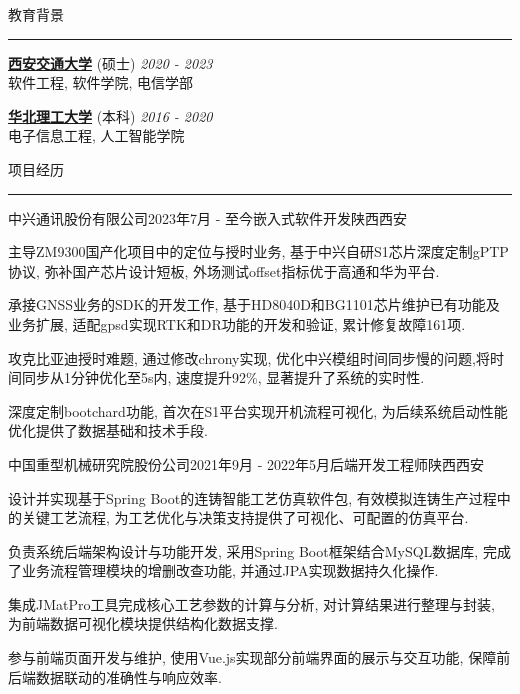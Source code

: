 \documentclass{cv} %
\renewenvironment{rSection}[1]{
\sectionskip
\textcolor{RoyalPurple}{\MakeUppercase{#1}}
\sectionlineskip
\hrule
\begin{list}{}{
\setlength{\leftmargin}{1.5em}
}
\item[]
}{
\end{list}
}
\begin{document}
\begin{rSection}{教育背景}

  {\bf \href{https://www.xjtu.edu.cn}{西安交通大学}} (硕士) \hfill {\em 2020 - 2023}
  \smallskip \\ 软件工程, 软件学院, 电信学部 \hfill

  {\bf \href{https://www.ncst.edu.cn}{华北理工大学}} (本科) \hfill {\em 2016 - 2020}
  \smallskip \\ 电子信息工程, 人工智能学院 \hfill

\end{rSection}

\begin{rSection}{项目经历}

  \begin{rSubsection}{中兴通讯股份有限公司}{2023年7月 - 至今}{嵌入式软件开发}{陕西西安}
    \item 主导ZM9300国产化项目中的定位与授时业务, 基于中兴自研S1芯片深度定制gPTP协议, 弥补国产芯片设计短板, 外场测试offset指标优于高通和华为平台.
    \item 承接GNSS业务的SDK的开发工作, 基于HD8040D和BG1101芯片维护已有功能及业务扩展, 适配gpsd实现RTK和DR功能的开发和验证, 累计修复故障161项.
    \item 攻克比亚迪授时难题, 通过修改chrony实现, 优化中兴模组时间同步慢的问题,将时间同步从1分钟优化至5s内, 速度提升92\%, 显著提升了系统的实时性.
    \item 深度定制bootchard功能, 首次在S1平台实现开机流程可视化, 为后续系统启动性能优化提供了数据基础和技术手段.
  \end{rSubsection}


  \begin{rSubsection}{中国重型机械研究院股份公司}{2021年9月 - 2022年5月}{后端开发工程师}{陕西西安}
    \item 设计并实现基于Spring Boot的连铸智能工艺仿真软件包, 有效模拟连铸生产过程中的关键工艺流程, 为工艺优化与决策支持提供了可视化、可配置的仿真平台.
    \item 负责系统后端架构设计与功能开发, 采用Spring Boot框架结合MySQL数据库, 完成了业务流程管理模块的增删改查功能, 并通过JPA实现数据持久化操作.
    \item 集成JMatPro工具完成核心工艺参数的计算与分析, 对计算结果进行整理与封装, 为前端数据可视化模块提供结构化数据支撑.
    \item 参与前端页面开发与维护, 使用Vue.js实现部分前端界面的展示与交互功能, 保障前后端数据联动的准确性与响应效率.
  \end{rSubsection}

\end{rSection}
\end{document}

